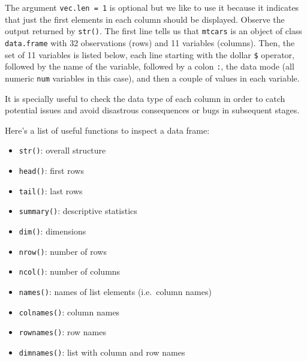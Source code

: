 \documentclass[
]{book}
\newenvironment{Shaded}{\begin{snugshade}}{\end{snugshade}}
\newcommand{\AttributeTok}[1]{\textcolor[rgb]{0.77,0.63,0.00}{#1}}
\newcommand{\CommentTok}[1]{\textcolor[rgb]{0.56,0.35,0.01}{\textit{#1}}}
\newcommand{\DecValTok}[1]{\textcolor[rgb]{0.00,0.00,0.81}{#1}}
\newcommand{\FunctionTok}[1]{\textcolor[rgb]{0.00,0.00,0.00}{#1}}
\newcommand{\NormalTok}[1]{#1}
\providecommand{\tightlist}{%
  \setlength{\itemsep}{0pt}\setlength{\parskip}{0pt}}
\begin{document}
\begin{Shaded}
\end{Shaded}

The argument \texttt{vec.len\ =\ 1} is optional but we like to use it because it
indicates that just the first elements in each column should be displayed.
Observe the output returned by \texttt{str()}. The first line tells us that \texttt{mtcars}
is an object of class \texttt{\textquotesingle{}data.frame\textquotesingle{}} with 32 observations (rows) and 11 variables
(columns). Then, the set of 11 variables is listed below, each line starting
with the dollar \texttt{\$} operator, followed by the name of the variable, followed
by a colon \texttt{:}, the data mode (all numeric \texttt{num} variables in this case),
and then a couple of values in each variable.

It is specially useful to check the data type of each column in order to catch
potential issues and avoid disastrous consequences or bugs in subsequent stages.

Here's a list of useful functions to inspect a data frame:

\begin{itemize}
\tightlist
\item
  \texttt{str()}: overall structure
\item
  \texttt{head()}: first rows
\item
  \texttt{tail()}: last rows
\item
  \texttt{summary()}: descriptive statistics
\item
  \texttt{dim()}: dimensions
\item
  \texttt{nrow()}: number of rows
\item
  \texttt{ncol()}: number of columns
\item
  \texttt{names()}: names of list elements (i.e.~column names)
\item
  \texttt{colnames()}: column names
\item
  \texttt{rownames()}: row names
\item
  \texttt{dimnames()}: list with column and row names
\end{itemize}
\end{document}
